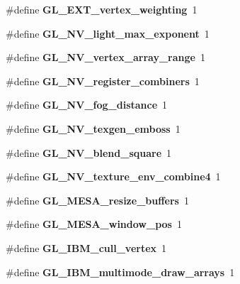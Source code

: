 \begin{DoxyCompactItemize}
\item 
\#define {\bfseries G\+L\+\_\+\+E\+X\+T\+\_\+vertex\+\_\+weighting}~1\label{_s_d_l__opengl_8h_a94978d483e00ff8dfd94b50aac7d698c}

\item 
\#define {\bfseries G\+L\+\_\+\+N\+V\+\_\+light\+\_\+max\+\_\+exponent}~1\label{_s_d_l__opengl_8h_abba68da43e96fe9d9a495bf67e805e2a}

\item 
\#define {\bfseries G\+L\+\_\+\+N\+V\+\_\+vertex\+\_\+array\+\_\+range}~1\label{_s_d_l__opengl_8h_a8d69619d2a177449a29e5651ad522434}

\item 
\#define {\bfseries G\+L\+\_\+\+N\+V\+\_\+register\+\_\+combiners}~1\label{_s_d_l__opengl_8h_a11dc0bbde9bc09d5ca48c41f01e19adb}

\item 
\#define {\bfseries G\+L\+\_\+\+N\+V\+\_\+fog\+\_\+distance}~1\label{_s_d_l__opengl_8h_a0c360942b0df75b640d13aba45a7d890}

\item 
\#define {\bfseries G\+L\+\_\+\+N\+V\+\_\+texgen\+\_\+emboss}~1\label{_s_d_l__opengl_8h_a6bca756b4bc83b2d2e3fb9741ce90e36}

\item 
\#define {\bfseries G\+L\+\_\+\+N\+V\+\_\+blend\+\_\+square}~1\label{_s_d_l__opengl_8h_a5dba9d942111a343621330604234ee4e}

\item 
\#define {\bfseries G\+L\+\_\+\+N\+V\+\_\+texture\+\_\+env\+\_\+combine4}~1\label{_s_d_l__opengl_8h_abb30e6b229ca83853dc4dfe85bad460c}

\item 
\#define {\bfseries G\+L\+\_\+\+M\+E\+S\+A\+\_\+resize\+\_\+buffers}~1\label{_s_d_l__opengl_8h_a971897a5a626e12c1fb5026d79a5ba4b}

\item 
\#define {\bfseries G\+L\+\_\+\+M\+E\+S\+A\+\_\+window\+\_\+pos}~1\label{_s_d_l__opengl_8h_ae08c370d8cee3c2f8d486a4f100673ac}

\item 
\#define {\bfseries G\+L\+\_\+\+I\+B\+M\+\_\+cull\+\_\+vertex}~1\label{_s_d_l__opengl_8h_a3a93a245950770cdf196c80e1cd157c1}

\item 
\#define {\bfseries G\+L\+\_\+\+I\+B\+M\+\_\+multimode\+\_\+draw\+\_\+arrays}~1\label{_s_d_l__opengl_8h_a54eb6d83c06bca0db5b6df3459cd58cb}


\end{DoxyCompactItemize}
